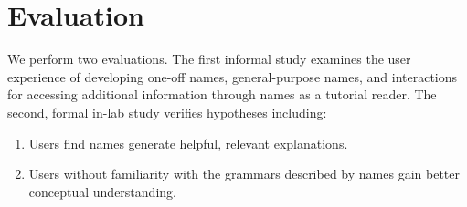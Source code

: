 \section{Evaluation}

We perform two evaluations.
The first informal study examines the user experience of developing one-off \glspl{name}, general-purpose \glspl{name}, and interactions for accessing additional information through \glspl{name} as a tutorial reader.
The second, formal in-lab study verifies hypotheses including:
\noindent
\begin{enumerate}%
\item Users find \glspl{name} generate helpful, relevant explanations.
\item Users without familiarity with the grammars described by \glspl{name} gain better conceptual understanding.
\end{enumerate}
